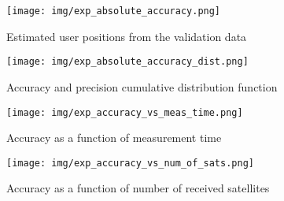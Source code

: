 \begin{figure}
    \centering
    \texttt{[image: img/exp\_absolute\_accuracy.png]}
    \caption{Estimated user positions from the validation data}
    \label{f_exp_absolute_accuracy}
\end{figure}


\begin{figure}
    \centering
    \texttt{[image: img/exp\_absolute\_accuracy\_dist.png]}
    \caption{Accuracy and precision cumulative distribution function}
    \label{f_exp_absolute_accuracy_dist}
\end{figure}


\begin{figure}
    \centering
    \texttt{[image: img/exp\_accuracy\_vs\_meas\_time.png]}
    \caption{Accuracy as a function of measurement time}
    \label{f_exp_accuracy_vs_meas_time}
\end{figure}


\begin{figure}
    \centering
    \texttt{[image: img/exp\_accuracy\_vs\_num\_of\_sats.png]}
    \caption{Accuracy as a function of number of received satellites}
    \label{f_exp_accuracy_vs_num_of_sats}
\end{figure}


